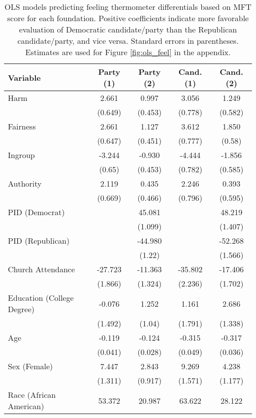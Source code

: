 \begin{table}[h]
\centering
\caption{OLS models predicting feeling thermometer differentials based on
           MFT score for each foundation. Positive coefficients indicate more favorable evaluation 
           of Democratic candidate/party than the Republican candidate/party, and vice versa. 
           Standard errors in parentheses. Estimates are used for Figure \ref{fig:ols_feel} 
           in the appendix.} 
\label{tab:ols_feel}
\begingroup\footnotesize
\begin{tabular}{lcccc}
  \hline
Variable & Party (1) & Party (2) & Cand. (1) & Cand. (2) \\ 
  \hline
Harm &   2.661 &   0.997 &   3.056 &   1.249 \\ 
   & (0.649) & (0.453) & (0.778) & (0.582) \\ 
  Fairness &   2.661 &   1.127 &   3.612 &   1.850 \\ 
   & (0.647) & (0.451) & (0.777) & (0.58) \\ 
  Ingroup &  -3.244 &  -0.930 &  -4.444 &  -1.856 \\ 
   & (0.65) & (0.453) & (0.782) & (0.585) \\ 
  Authority &   2.119 &   0.435 &   2.246 &   0.393 \\ 
   & (0.669) & (0.466) & (0.796) & (0.595) \\ 
  PID (Democrat) &  &  45.081 &  &  48.219 \\ 
   &  & (1.099) &  & (1.407) \\ 
  PID (Republican) &  & -44.980 &  & -52.268 \\ 
   &  & (1.22) &  & (1.566) \\ 
  Church Attendance & -27.723 & -11.363 & -35.802 & -17.406 \\ 
   & (1.866) & (1.324) & (2.236) & (1.702) \\ 
  Education (College Degree) &  -0.076 &   1.252 &   1.161 &   2.686 \\ 
   & (1.492) & (1.04) & (1.791) & (1.338) \\ 
  Age &  -0.119 &  -0.124 &  -0.315 &  -0.317 \\ 
   & (0.041) & (0.028) & (0.049) & (0.036) \\ 
  Sex (Female) &   7.447 &   2.843 &   9.269 &   4.238 \\ 
   & (1.311) & (0.917) & (1.571) & (1.177) \\ 
  Race (African American) &  53.372 &  20.987 &  63.622 &  28.122 \\ 

\end{tabular}
\end{table}

